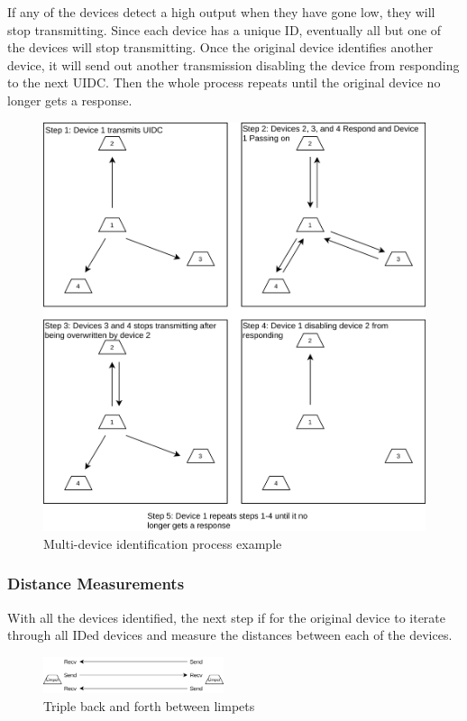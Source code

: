 \documentclass{article}
\begin{document}
If any of the devices detect a high output when they have gone low, they will stop transmitting. Since each device has a unique ID, eventually all but one of the devices will stop transmitting. Once the original device identifies another device, it will send out another transmission disabling the device from responding to the next UIDC. Then the whole process repeats until the original device no longer gets a response.

\begin{figure}[h!]
	\includegraphics[width=\textwidth]{ID-Process}
	\caption{Multi-device identification process example}
	\label{fig:IDProcess}
\end{figure}

\subsubsection{Distance Measurements}
With all the devices identified, the next step if for the original device to iterate through all IDed devices and measure the distances between each of the devices.\\


\begin{figure}[!h]
	\centering
	\includegraphics[width=200px]{TriLimpet}
	\caption{Triple back and forth between limpets}
	\label{fig:TriLimp}
\end{figure}
\end{document}
